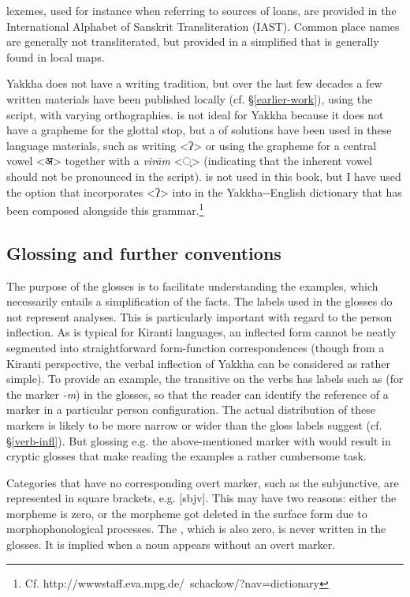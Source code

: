  lexemes, used for instance when referring to sources of loans, are provided in the International Alphabet of Sanskrit Transliteration (IAST). Common place names are generally not transliterated, but provided in a simplified  that is generally found in local maps.

Yakkha does not have a writing tradition, but over the last few decades a few written materials have been published locally (cf. §\ref{earlier-work}), using the  script, with varying orthographies.  is not ideal for Yakkha because it does not have a grapheme for the glottal stop, but a  of solutions have been used in these language materials, such as writing <ʔ>  or using the grapheme for a central vowel <{\Deva अ}> together with a \emph{virām} <{\Deva  ्}>  (indicating that the inherent vowel should not be pronounced in the  script).   is not used in this book, but  I have used the option that incorporates <ʔ> into  in the Yakkha--English dictionary that has been composed alongside this grammar.\footnote{Cf. http://wwwstaff.eva.mpg.de/~schackow/?nav=dictionary}


\subsection{Glossing and further conventions}

The purpose of the glosses is to facilitate understanding the examples, which necessarily entails a simplification of the facts. The labels used in the glosses do not represent analyses. This is particularly important with regard to the person inflection. As is typical for Kiranti languages, an inflected form cannot be neatly segmented into straightforward form-function correspondences (though from a  Kiranti perspective, the verbal inflection of Yakkha can be considered as rather simple). To provide an example, the transitive  on the verbs has labels such as  (for the marker \emph{-m}) in the glosses, so that the reader can identify the reference of a marker in a particular person configuration. The actual distribution of these markers is likely to be more narrow or wider than the gloss labels suggest (cf. §\ref{verb-infl}). But glossing e.g. the above-mentioned marker with   would result in cryptic glosses that make reading the examples a rather cumbersome task. 

Categories that have no corresponding overt marker, such as the subjunctive, are represented in square brackets, e.g. [{\sc sbjv}]. This may have two reasons: either the morpheme is zero, or the morpheme got deleted in the surface form due to morphophonological processes. The , which is also zero, is never written in the glosses. It is implied when a noun appears without an overt  marker. 

